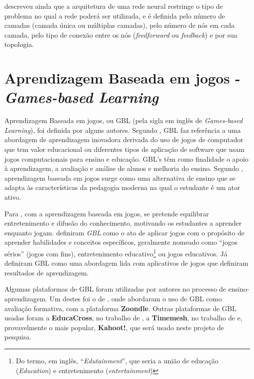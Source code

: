 \documentclass[
	12pt,				%
	openright,			%
	oneside,
	a4paper,			%
	english,			%
	french,				%
	spanish,			%
	brazil,				%
	]{abntex2}
\begin{document}
 descreveu ainda que a arquitetura de uma rede neural restringe o tipo de problema no qual a rede poderá ser utilizada, e é definida pelo número de camadas (camada única ou múltiplas camadas), pelo número de nós em cada camada, pelo tipo de conexão entre os nós (\textit{feedforward} ou \textit{feedback}) e por sua topologia.

\section{Aprendizagem Baseada em jogos - \textit{Games-based Learning}}
\label{sec:GBL}

Aprendizagem Baseada em jogos, ou GBL (pela sigla em inglês de \textit{Games-based Learning}), foi definida por alguns autores. Segundo , GBL faz referência a uma abordagem de aprendizagem inovadora derivada do uso de jogos de computador que tem valor educacional ou diferentes tipos de aplicação de software que usam jogos computacionais para ensino e educação. GBL's têm como finalidade o apoio à aprendizagem, a avaliação e análise de alunos e melhoria do ensino. Segundo , aprendizagem baseada em jogos surge como uma alternativa de ensino que se adapta às características da pedagogia moderna na qual o estudante é um ator ativo.

Para , com a aprendizagem baseada em jogos, se pretende equilibrar entretenimento e difusão do conhecimento, motivando os estudantes a aprender enquanto jogam.  definiram \textit{GBL} como o ato de aplicar jogos com o propósito de aprender habilidades e conceitos específicos, geralmente nomeado como “jogos sérios” (jogos com fins), entretenimento educativo\footnote{Do termo, em inglês, “\textit{Edutainment}”, que seria a união de educação (\textit{Education}) e entretenimento (\textit{entertainment})} ou jogos educativos. Já  definiram GBL como uma abordagem lida com aplicativos de jogos que definiram resultados de aprendizagem.

Algumas plataformas de GBL foram utilizadas por autores no processo de ensino-aprendizagem. Um destes foi o de , onde abordaram o uso de GBL como avaliação formativa, com a plataforma \textbf{Zoondle}. Outras plataformas de GBL usadas foram a \textbf{EducaCross}, no trabalho de , a \textbf{Timemesh}, no trabalho de  e, provavelmente o mais popular, \textbf{Kahoot!}, que será usado neste projeto de pesquisa.
\end{document}
